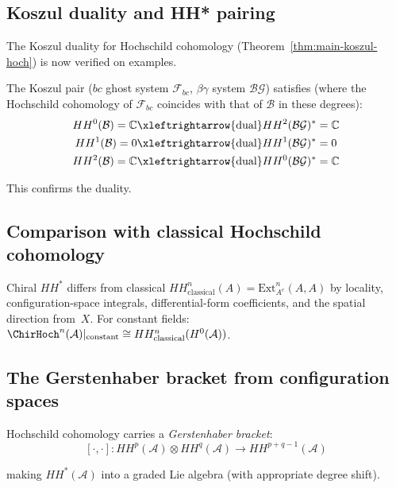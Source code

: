 \subsection{Koszul duality and HH* pairing}

The Koszul duality for Hochschild cohomology (Theorem~\ref{thm:main-koszul-hoch})\label{thm:koszul-duality-HH} is now verified on examples.

\begin{verification}\label{ver:boson-fermion-HH}
The Koszul pair ($bc$ ghost system $\mathcal{F}_{bc}$, $\beta\gamma$ system $\mathcal{BG}$) satisfies (where the Hochschild cohomology of $\mathcal{F}_{bc}$ coincides with that of $\mathcal{B}$ in these degrees):
\begin{align*}
HH^0(\mathcal{B}) = \mathbb{C} &\xleftrightarrow{\text{dual}} HH^2(\mathcal{BG})^* = \mathbb{C}\\
HH^1(\mathcal{B}) = 0 &\xleftrightarrow{\text{dual}} HH^1(\mathcal{BG})^* = 0\\
HH^2(\mathcal{B}) = \mathbb{C} &\xleftrightarrow{\text{dual}} HH^0(\mathcal{BG})^* = \mathbb{C}
\end{align*}

This confirms the duality.
\end{verification}

\subsection{Comparison with classical Hochschild cohomology}

\begin{remark}\label{rem:chiral-vs-classical-hochschild}
Chiral $HH^*$ differs from classical
$HH^n_{\text{classical}}(A) = \mathrm{Ext}^n_{A^e}(A,A)$ by locality,
configuration-space integrals, differential-form coefficients, and the
spatial direction from~$X$.  For constant fields:
$\ChirHoch^n(\mathcal{A})|_{\text{constant}} \cong
HH^n_{\text{classical}}(H^0(\mathcal{A}))$.
\end{remark}

\subsection{The Gerstenhaber bracket from configuration spaces}

\begin{theorem}\label{thm:gerstenhaber-structure}
Hochschild cohomology carries a \emph{Gerstenhaber bracket}:
\[[\cdot, \cdot]: HH^p(\mathcal{A}) \otimes HH^q(\mathcal{A}) \to HH^{p+q-1}(\mathcal{A})\]

making $HH^*(\mathcal{A})$ into a graded Lie algebra (with appropriate degree shift).
\end{theorem}

